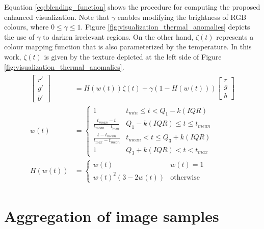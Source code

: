 Equation \ref{eq:blending_function} shows the procedure for computing the proposed enhanced visualization. Note that $\gamma$ enables modifying the brightness of RGB colours, where $0 \leq \gamma \leq 1$. Figure \ref{fig:visualization_thermal_anomalies} depicts the use of $\gamma$ to darken irrelevant regions. On the other hand, $\zeta(t)$ represents a colour mapping function that is also parameterized by the temperature. In this work, $\zeta(t)$ is given by the texture depicted at the left side of Figure \ref{fig:visualization_thermal_anomalies}.
\begin{gather}
    \label{eq:blending_function}
    \begin{aligned}
        \begin{bmatrix}
            r'\\g'\\b'
        \end{bmatrix} &=
        H(w(t))\zeta(t) + \gamma(1 - H(w(t)))\begin{bmatrix}
            r\\g\\b
        \end{bmatrix}\\
        w(t) &=
        \begin{cases}
            1 &t_{min} \leq t < Q_1 - k(\textit{IQR})\\
            \frac{t_{mean} - t}{t_{mean} - t_{min}} &Q_1 - k(\textit{IQR}) \leq t \leq t_{mean}\\
            \frac{t - t_{mean}}{t_{max} - t_{mean}} &t_{mean} < t \leq Q_3 + k(\textit{IQR})\\
            1 &Q_3 + k(\textit{IQR}) < t < t_{max}
        \end{cases}\\
        H(w(t)) &=
        \begin{cases}
            w(t) &w(t) = 1\\
            w(t)^2(3 - 2w(t)) &\text{otherwise}
        \end{cases}
    \end{aligned}
\end{gather}

\section{Aggregation of image samples}

